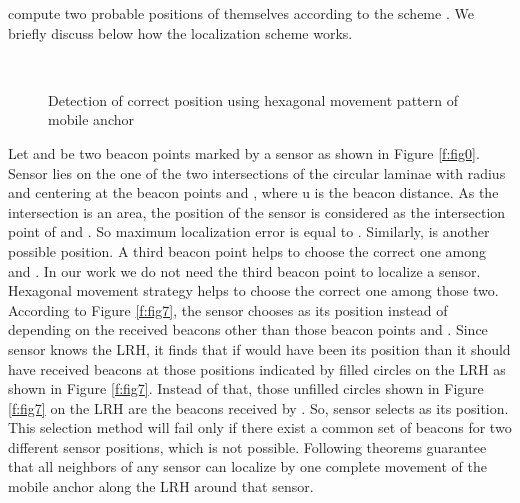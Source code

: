 \documentclass[preprint,11pt]{elsarticle}
\begin{document}
compute two probable positions of themselves according to the scheme \cite{Lee2009}. We briefly discuss below how the localization scheme \cite{Lee2009} works.
\begin{figure}[h]
    \centering
    ~~~~~~~
\caption{Detection of correct position using hexagonal movement pattern of mobile anchor}
\end{figure}


Let  and  be two beacon points marked by a sensor as shown in  Figure \ref{f:fig0}.
Sensor lies on the one of the two intersections of the circular laminae with radius
 and  centering at the beacon points  and ,  where u is the beacon distance.
As the intersection is an area, the position of the sensor is considered as the intersection point  of  and .
So maximum localization error is equal to .
Similarly,  is another possible position. A third beacon point helps to choose the correct one among  and .
In our work we do not need the third beacon point to localize a sensor. Hexagonal movement strategy helps to
choose the correct one among those two. According to  Figure \ref{f:fig7}, the sensor chooses  as its
position instead of  depending on the received beacons other than those beacon points  and . Since sensor
knows the LRH, it finds that if  would have been its position than it should have received
beacons at those positions indicated by filled circles on the LRH as shown in  Figure \ref{f:fig7}.
Instead of that, those unfilled circles shown in  Figure \ref{f:fig7} on the LRH are the beacons received by .
So, sensor selects  as its position. This selection method will fail only if there exist a common set of beacons
for two different sensor positions, which is not possible.
Following theorems guarantee that all neighbors of any sensor can localize by one complete movement of the
mobile anchor along the LRH around that sensor.
\end{document}
